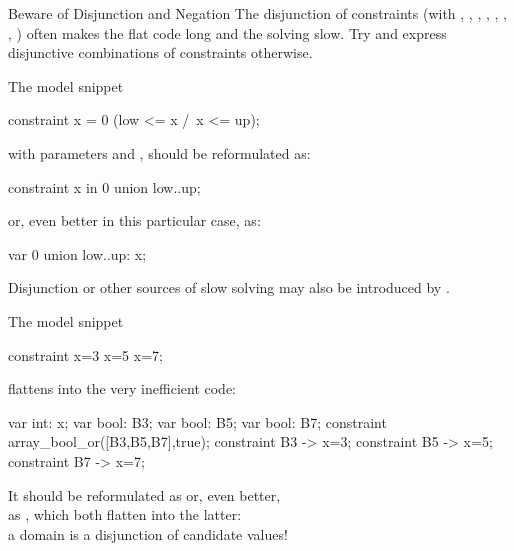 \documentclass{cons-beamer}
\begin{document}
\begin{flashcardminizinc}
\begin{frame}[fragile]{Beware of Disjunction and Negation}
  \alert{The disjunction of constraints (with \mzninline{\\/},
    , \mzninline{<-}, \mzninline{->}, \mzninline{<->},
    , , ) often makes the flat
    code long and the solving slow.}
  Try and express disjunctive combinations of constraints otherwise.
  \begin{example}
    The model snippet
    \vspace{-1mm}
    \begin{mznno}
  constraint x = 0 \/ (low <= x /\ x <= up);
    \end{mznno}
    with parameters  and , should be
    reformulated as: 
    \vspace{-1mm}
    \begin{mznno}
  constraint x in {0} union low..up;
    \end{mznno}
    or, even better in this particular case, as: 
    \vspace{-1mm}
    \begin{mznno}
  var {0} union low..up: x;
    \end{mznno}
  \end{example}\vfill
  \alert{Disjunction or other sources of slow solving may also be
    introduced by .}
\end{frame}

\begin{frame}[fragile]
  \begin{example}
    The model snippet
    \begin{mznno}
  constraint x=3 \/ x=5 \/ x=7;
    \end{mznno}
    flattens into the very inefficient code:
    \begin{mznno}
  var int: x;
  var bool: B3; var bool: B5; var bool: B7;
  constraint array_bool_or([B3,B5,B7],true);
  constraint B3 -> x=3; %
  constraint B5 -> x=5; %
  constraint B7 -> x=7; %
    \end{mznno}
    It should be reformulated as 
    or, even better, \\ as , which both
    flatten into the latter: \\ a domain is a disjunction of candidate
    values!
  \end{example}
\end{frame}


\end{flashcardminizinc}
\end{document}

